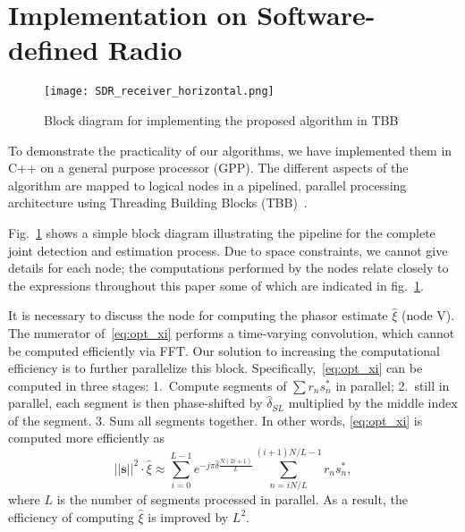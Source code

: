 \section{Implementation on Software-defined Radio}%
\label{sec:implementation_on_SDR}

\begin{figure}[t]
    \centerline{\texttt{[image: SDR\_receiver\_horizontal.png]}}
    \caption{Block diagram for implementing the proposed algorithm in TBB}
    \label{fig:SDR_receiver}
    \end{figure}

To demonstrate the practicality of our algorithms, we have implemented them in C++ on a general
purpose processor (GPP).
The different aspects of the algorithm are mapped to logical nodes in a pipelined, parallel processing architecture
using Threading Building Blocks (TBB)~\cite{Michael_19}.

Fig.~\ref{fig:SDR_receiver} shows a simple block diagram
illustrating the pipeline for the complete joint detection and
estimation process.
Due to space constraints, we cannot give details for each node; the
computations performed by the nodes relate closely to the expressions
throughout this paper some of which are indicated in fig.~\ref{fig:SDR_receiver}.

It is necessary to discuss the node for computing the phasor estimate $\hat{\xi}$ (node V). 
The numerator of~\eqref{eq:opt_xi} performs a time-varying
convolution,
which cannot be computed efficiently via FFT.
Our solution to increasing the computational efficiency is to further
parallelize this block.
Specifically,~\eqref{eq:opt_xi} can be computed in three stages:
1.~Compute  segments of $\sum r_ns_n^*$ in  parallel;
2.~still in parallel, each segment is then phase-shifted by $\hat{\delta}_{SL}$
multiplied by the middle index of the 
segment.
3. Sum all segments together.
In other words, \eqref{eq:opt_xi} is computed more efficiently as
\begin{equation}
  \label{eq:refined_opt_S}
  ||\bm{s}||^2\cdot\hat{\xi} \approx \sum_{i=0}^{L-1} e^{-j\pi \hat{\delta}\frac{N(2i+1)}{L}}
  \sum_{n=iN/L}^{(i+1)N/L-1}r_ns_n^*,
\end{equation}
where $L$ is the number of segments processed in parallel.
As a result,
the efficiency of computing $\hat{\xi}$ is improved by $L^2$.

